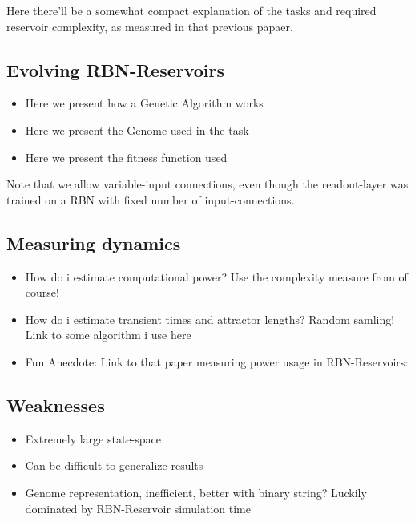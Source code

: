 Here there'll be a somewhat compact explanation of the tasks and required reservoir complexity,
as measured in that previous papaer.

\subsection{Evolving RBN-Reservoirs}

\begin{itemize}
  \item Here we present how a Genetic Algorithm works
  \item Here we present the Genome used in the task
  \item Here we present the fitness function used
\end{itemize}

Note that we allow variable-input connections, even though the readout-layer was trained on a RBN with fixed number of input-connections.

\subsection{Measuring dynamics}

\begin{itemize}
  \item
    How do i estimate computational power?
    Use the complexity measure from \cite{rbn-reservoir} of course!
  \item
    How do i estimate transient times and attractor lengths?
    Random samling! Link to some algorithm i use here
  \item
    Fun Anecdote: Link to that paper measuring power usage in RBN-Reservoirs:
    \cite{rbn-reservoir-energy-efficiency}
\end{itemize}

\subsection{Weaknesses}

\begin{itemize}
  \item Extremely large state-space
  \item Can be difficult to generalize results
  \item
    Genome representation, inefficient, better with binary string?
    Luckily dominated by RBN-Reservoir simulation time
\end{itemize}


